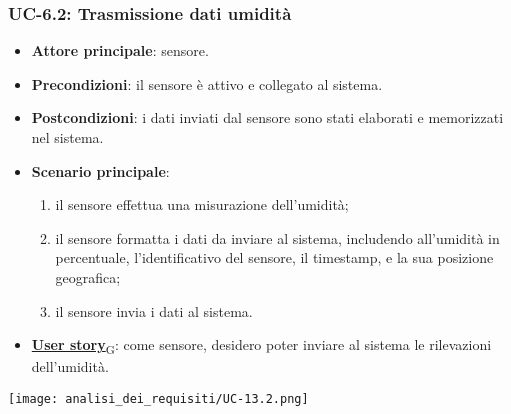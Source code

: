 \subsubsection{UC-6.2: Trasmissione dati umidità}
\begin{itemize}
	\item \textbf{Attore principale}: sensore.
	\item \textbf{Precondizioni}: il sensore è attivo e collegato al sistema.
	\item \textbf{Postcondizioni}: i dati inviati dal sensore sono stati elaborati e memorizzati nel sistema.
	\item \textbf{Scenario principale}:
	      \begin{enumerate}
		      \item il sensore effettua una misurazione dell'umidità;
		      \item il sensore formatta i dati da inviare al sistema, includendo all'umidità in percentuale, l'identificativo del sensore,
		            il timestamp, e la sua posizione geografica;
		      \item il sensore invia i dati al sistema.
	      \end{enumerate}
	\item \href{https://7last.github.io/docs/rtb/documentazione-interna/glossario\#user-story}{\textbf{User story}\textsubscript{G}}: come sensore, desidero poter inviare al sistema le rilevazioni dell'umidità.
\end{itemize}

\begin{center}
	\texttt{[image: analisi\_dei\_requisiti/UC-13.2.png]}
\end{center}

